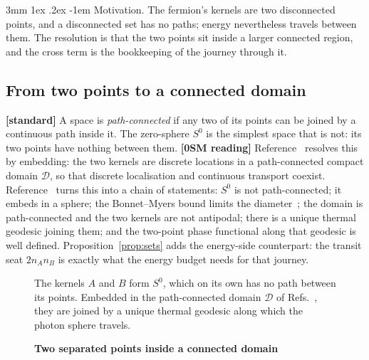 \documentclass[%
 reprint, amsmath,amssymb, aps, prb, ]{revtex4-2}
\makeatletter
\numberwithin{equation}{section}
\renewcommand\paragraph{%
  \@startsection{paragraph}{4}{\z@}%
    {3mm \@plus 1ex \@minus .2ex}
    {-1em}
    {\normalfont\normalsize\itshape}}
\makeatother
\begin{document}
\paragraph{Motivation.} The fermion's kernels are two disconnected points, and a disconnected set has no paths; energy nevertheless travels between them. The resolution is that the two points sit inside a larger connected region, and the cross term is the bookkeeping of the journey through it.

\subsection{From two points to a connected domain}

\textbf{[standard]} A space is \emph{path-connected} if any two of its points can be joined by a continuous path inside it. The zero-sphere $S^0$ is the simplest space that is not: its two points have nothing between them. \textbf{[0SM reading]} Reference~\cite{ref:p33} resolves this by embedding: the two kernels are discrete locations in a path-connected compact domain $\mathcal{D}$, so that discrete localisation and continuous transport coexist. Reference~\cite{ref:p51} turns this into a chain of statements: $S^0$ is not path-connected; it embeds in a sphere; the Bonnet--Myers bound limits the diameter~\cite{ref:myers}; the domain is path-connected and the two kernels are not antipodal; there is a unique thermal geodesic joining them; and the two-point phase functional along that geodesic is well defined. Proposition~\ref{prop:sets} adds the energy-side counterpart: the transit seat $2n_An_B$ is exactly what the energy budget needs for that journey.

\begin{figure}[t!]
\centering
{}
\caption{\textbf{Two separated points inside a connected domain}}
\label{fig:embed}
\vspace{0.4em}
\begin{minipage}{0.95\columnwidth}
\justifying\small
The kernels $A$ and $B$ form $S^0$, which on its own has no path between its points. Embedded in the path-connected domain $\mathcal{D}$ of Refs.~\cite{ref:p33,ref:p51}, they are joined by a unique thermal geodesic along which the photon sphere travels.
\end{minipage}
\end{figure}
\end{document}
